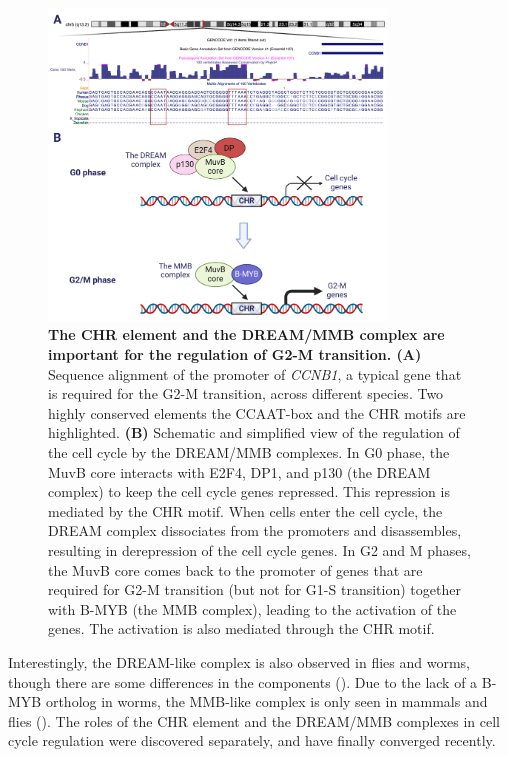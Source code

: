 \begin{figure}[!t]
    \centering
    \includegraphics[width=0.8\textwidth]{chapter1/figures/fig4.pdf}
    \caption[The CHR element and the DREAM/MMB complex are important for the regulation of G2-M transition]{\textbf{The CHR element and the DREAM/MMB complex are important for the regulation of G2-M transition. (A)} Sequence alignment of the promoter of \textit{CCNB1}, a typical gene that is required for the G2-M transition, across different species. Two highly conserved elements the CCAAT-box and the CHR motifs are highlighted. \textbf{(B)} Schematic and simplified view of the regulation of the cell cycle by the DREAM/MMB complexes. In G0 phase, the MuvB core interacts with E2F4, DP1, and p130 (the DREAM complex) to keep the cell cycle genes repressed. This repression is mediated by the CHR motif. When cells enter the cell cycle, the DREAM complex dissociates from the promoters and disassembles, resulting in derepression of the cell cycle genes. In G2 and M phases, the MuvB core comes back to the promoter of genes that are required for G2-M transition (but not for G1-S transition) together with B-MYB (the MMB complex), leading to the activation of the genes. The activation is also mediated through the CHR motif.}
    \label{fig:fig4}
\end{figure}

Interestingly, the DREAM-like complex is also observed in flies and worms, though there are some differences in the components (\cite{Beall2002-mq,korenjak2004native}). Due to the lack of a B-MYB ortholog in worms, the MMB-like complex is only seen in mammals and flies (\cite{harrison2006some}). The roles of the CHR element and the DREAM/MMB complexes in cell cycle regulation were discovered separately, and have finally converged recently.

